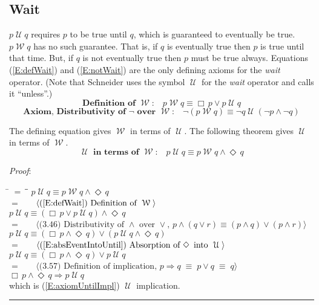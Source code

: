\documentclass[12pt, fleqn, leqno]{article}
\newcommand{\lgap}{2pt}                             %
\newcommand{\mymathindent}{24pt}                    %
\newcommand{\equivs}{\ensuremath{\;\equiv\;}}       %
\newcommand{\impl}{\ensuremath{\Rightarrow}}        %
\newcommand{\Until}{\;\mathcal{U}\;}
\newcommand{\Wait}{\;\mathcal{W}\;}
\newcommand{\Event}{\Diamond\,}
\newcommand{\Always}{\Box\,}
\newcommand{\myqed}{\rule[-.23ex]{1.2ex}{2.0ex}}
\newcommand{\myqedtab}{\hspace{384pt}}              %
\newcommand{\Gll} {\langle}                         %
\newcommand{\Ggg} {\rangle}                         %
\newcommand{\Hint}[1]     {\ \ \ $\Gll              \mbox{#1} \Ggg$ }   %
\begin{document}
\subsection{Wait}\label{section-wait}

$p\Until q$ requires $p$ to be true until $q$, which is guaranteed to eventually be true.
$p\Wait q$ has no such guarantee.
That is, if $q$ is eventually true then $p$ is true until that time.
But, if $q$ is not eventually true then $p$ must be true always.
Equations (\ref{E:defWait}) and (\ref{E:notWait}) are the only defining axioms for the \textit{wait} operator.
(Note that Schneider \cite{Schn} uses the symbol $\Until$ for the \textit{wait} operator and calls it ``unless''.)
\begin{equation}\label{E:defWait}
\textbf{Definition of $\Wait$:}\quad p \Wait q \equiv \Always p \lor p \Until q 
\end{equation}
\begin{equation}\label{E:notWait}
\textbf{Axiom, Distributivity of $\neg$ over $\Wait$:}\quad \neg (p \Wait q) \equiv \neg q \Until (\neg p \land \neg q)
\end{equation}

The defining equation gives $\Wait$ in terms of $\Until$. The following theorem gives $\Until$ in terms of $\Wait$.
\begin{equation}\label{E:untilFromWait}
\textbf{$\Until$ in terms of $\Wait$:}\quad p \Until q \equiv p \Wait q\land \Event q
\end{equation}

\emph{Proof}:
\begin{tabbing}
\hspace{\mymathindent} \= $= \;$ \= \myqedtab \= \kill
\> \> $p \Until q \equiv p \Wait q\land \Event q$\\[\lgap]
\> $=$ \> \Hint{(\ref{E:defWait}) Definition of $\Wait$} \\[\lgap]
\> \> $p \Until q \equiv (\Always p\lor p \Until q)\land \Event q$\\[\lgap]
\> $=$ \> \Hint{(3.46) Distributivity of $\land$ over $\lor$, $p\land (q\lor r)\equiv (p\land q)\lor (p\land r)$} \\[\lgap]
\> \> $p \Until q \equiv (\Always p\land \Event q)\lor (p \Until q\land \Event q)$\\[\lgap]
\> $=$ \> \Hint{(\ref{E:absEventIntoUntil}) Absorption of $\Event$ into $\Until$} \\[\lgap]
\> \> $p \Until q \equiv (\Always p\land \Event q)\lor p \Until q$\\[\lgap]
\> $=$ \> \Hint{(3.57) Definition of implication, $p\impl q\equivs p\lor q \equivs q$} \\[\lgap]
\> \> $\Always p\land \Event q\impl p\Until q$\\[\lgap]
\> which is (\ref{E:axiomUntilImpl}) $\Until$ implication. \quad \myqed
\end{tabbing}
\end{document}
